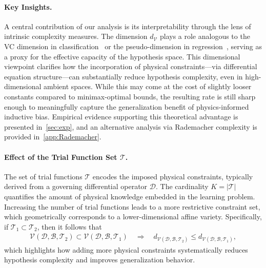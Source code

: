 \documentclass{article}
\theoremstyle{plain}
\theoremstyle{definition}
\theoremstyle{remark}
\begin{document}
\paragraph{Key Insights.}
A central contribution of our analysis is its interpretability through the lens of intrinsic complexity measures. The dimension \( d_{\mathcal{V}} \) plays a role analogous to the VC dimension in classification~\citep{abu1989vapnik} or the pseudo-dimension in regression~\citep{pollard1990empirical}, serving as a proxy for the effective capacity of the hypothesis space. This dimensional viewpoint clarifies how the incorporation of physical constraints—via differential equation structure—can substantially reduce hypothesis complexity, even in high-dimensional ambient spaces. While this may come at the cost of slightly looser constants compared to minimax-optimal bounds, the resulting rate is still sharp enough to meaningfully capture the generalization benefit of physics-informed inductive bias. Empirical evidence supporting this theoretical advantage is presented in~\cref{sec:exp}, and an alternative analysis via Rademacher complexity is provided in~\cref{app:Rademacher}.

\paragraph{Effect of the Trial Function Set \(\mathcal{T}\).}
The set of trial functions \( \mathcal{T} \) encodes the imposed physical constraints, typically derived from a governing differential operator \( \mathscr{D} \). The cardinality \( K = |\mathcal{T}| \) quantifies the amount of physical knowledge embedded in the learning problem. Increasing the number of trial functions leads to a more restrictive constraint set, which geometrically corresponds to a lower-dimensional affine variety. Specifically, if \( \mathcal{T}_1 \subset \mathcal{T}_2 \), then it follows that
\begin{align*}
\mathcal{V}(\mathscr{D}, \mathcal{B}, \mathcal{T}_2) \subset \mathcal{V}(\mathscr{D}, \mathcal{B}, \mathcal{T}_1) \quad \Rightarrow \quad d_{\mathcal{V}(\mathscr{D}, \mathcal{B}, \mathcal{T}_2)} \leq d_{\mathcal{V}(\mathscr{D}, \mathcal{B}, \mathcal{T}_1)},
\end{align*}
which highlights how adding more physical constraints systematically reduces hypothesis complexity and improves generalization behavior.
\end{document}
